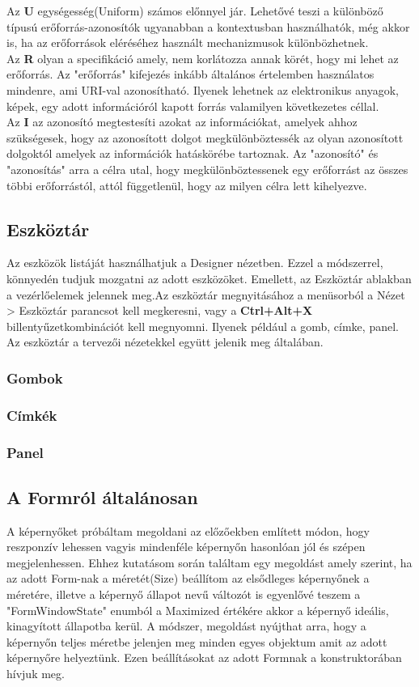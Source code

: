 \documentclass[tocnopagenum]{thesis-ekf}
\theoremstyle{definition}
\theoremstyle{remark}
\begin{document}
Az \textbf{U} egységesség(Uniform) számos előnnyel jár. Lehetővé teszi a különböző típusú
erőforrás-azonosítók ugyanabban a kontextusban használhatók, még akkor is, ha
az erőforrások eléréséhez használt mechanizmusok különbözhetnek.
\\
Az \textbf{R} olyan a specifikáció amely, nem korlátozza annak körét, hogy mi lehet az erőforrás. Az "erőforrás" kifejezés inkább általános értelemben használatos mindenre, ami URI-val azonosítható. Ilyenek lehetnek az elektronikus anyagok, képek, egy adott információról kapott forrás valamilyen következetes céllal.
\\
Az \textbf{I} az azonosító megtestesíti azokat az információkat, amelyek ahhoz szükségesek, hogy az azonosított dolgot megkülönböztessék az olyan azonosított dolgoktól amelyek az információk hatáskörébe tartoznak.
Az "azonosító" és "azonosítás" arra a célra utal, hogy megkülönböztessenek egy erőforrást az összes többi erőforrástól, attól függetlenül, hogy az milyen célra lett kihelyezve.  
	\subsection{Eszköztár}
		\label{EszkozLista}
		Az eszközök listáját használhatjuk a Designer nézetben. Ezzel a módszerrel, könnyedén tudjuk mozgatni az adott eszközöket. Emellett, az Eszköztár ablakban a vezérlőelemek jelennek meg.Az eszköztár megnyitásához a menüsorból a Nézet > Eszköztár parancsot kell megkeresni, vagy a \textbf{Ctrl+Alt+X} billentyűzetkombinációt kell megnyomni. Ilyenek például a gomb, címke, panel. Az eszköztár a tervezői nézetekkel együtt jelenik meg általában.
	\subsubsection*{Gombok}
	\label{Gombok}
	\subsubsection*{Címkék}
	\label{Címkék}
	\subsubsection*{Panel}
	\label{Panel}
	\subsection*{A Formról általánosan}
	A képernyőket próbáltam megoldani az előzőekben említett módon, hogy reszponzív lehessen vagyis mindenféle képernyőn hasonlóan jól és szépen megjelenhessen. Ehhez kutatásom során találtam egy megoldást amely szerint, ha az adott Form-nak a méretét(Size) beállítom az elsődleges képernyőnek a méretére, illetve a képernyő állapot nevű változót is egyenlővé teszem a "FormWindowState" enumból a Maximized értékére akkor a képernyő ideális, kinagyított állapotba kerül. A módszer, megoldást nyújthat arra, hogy a képernyőn teljes méretbe jelenjen meg minden egyes objektum amit az adott képernyőre helyeztünk. Ezen beállításokat az adott Formnak a konstruktorában hívjuk meg.
\end{document}
